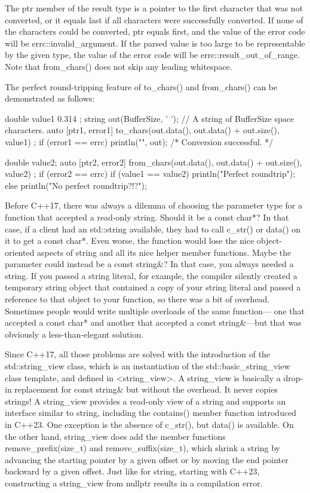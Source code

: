 The ptr member of the result type is a pointer to the first character that was not converted, or it equals last if all characters were successfully converted. If none of the characters could be converted, ptr equals first, and the value of the error code will be errc::invalid\_argument. If the parsed value is too large to be representable by the given type, the value of the error code will be errc::result\_out\_of\_range. Note that from\_chars() does not skip any leading whitespace.

The perfect round-tripping feature of to\_chars() and from\_chars() can be demonstrated as follows:

\begin{cpp}
double value1 { 0.314 };
string out(BufferSize, ' '); // A string of BufferSize space characters.
auto [ptr1, error1] { to_chars(out.data(), out.data() + out.size(), value1) };
if (error1 == errc{}) { println("{}", out); /* Conversion successful. */ }

double value2;
auto [ptr2, error2] { from_chars(out.data(), out.data() + out.size(), value2) };
if (error2 == errc{}) {
    if (value1 == value2) {
        println("Perfect roundtrip");
    } else {
        println("No perfect roundtrip?!?");
    }
}
\end{cpp}


Before C++17, there was always a dilemma of choosing the parameter type for a function that accepted a read-only string. Should it be a const char*? In that case, if a client had an std::string available, they had to call c\_str() or data() on it to get a const char*. Even worse, the function would lose the nice object-oriented aspects of string and all its nice helper member functions. Maybe the parameter could instead be a const string\&? In that case, you always needed a string. If you passed a string literal, for example, the compiler silently created a temporary string object that contained a copy of your string literal and passed a reference to that object to your function, so there was a bit of overhead. Sometimes people would write multiple overloads of the same function— one that accepted a const char* and another that accepted a const string\&—but that was obviously a less-than-elegant solution.

Since C++17, all those problems are solved with the introduction of the std::string\_view class, which is an instantiation of the std::basic\_string\_view class template, and defined in <string\_view>. A string\_view is basically a drop-in replacement for const string\& but without the overhead. It never copies strings! A string\_view provides a read-only view of a string and supports an interface similar to string, including the contains() member function introduced in C++23. One exception is the absence of c\_str(), but data() is available. On the other hand, string\_view does add the member functions remove\_prefix(size\_t) and remove\_suffix(size\_t), which shrink a string by advancing the starting pointer by a given offset or by moving the end pointer backward by a given offset. Just like for string, starting with C++23, constructing a string\_view from nullptr results in a compilation error.

